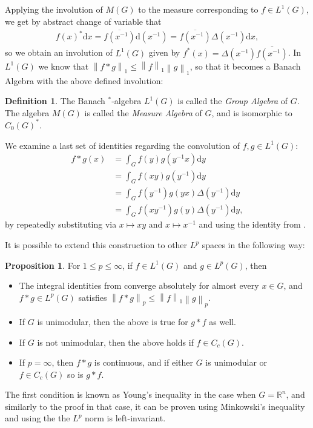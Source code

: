 \documentclass[10pt,twoside,openany,final]{memoir}
\theoremstyle{definition}
\newtheorem{proposition}[theorem]{Proposition}
\newtheorem{definition}[theorem]{Definition}
\theoremstyle{Break}
\newcommand{\lv}{\left\lVert}
\newcommand{\rv}{\right\rVert}
\newcommand{\R}{\mathbb{R}}
\renewcommand{\d}{\mathrm{d}}
\begin{document}
Applying the involution of $M(G)$ to the measure corresponding to $f \in L^1(G)$, we get by abstract change of variable that
\begin{align*}
	f(x)^* \d x = \overline{f(x^{-1})} \d (x^{-1})=\overline{f(x^{-1})} \Delta(x^{-1}) \d x,
\end{align*}
so we obtain an involution of $L^1(G)$ given by $f^*(x)=\Delta(x^{-1}) \overline{f(x^{-1})}$. In $L^1(G)$ we know that $\lv f \ast g \rv_1 \leq \lv f \rv_1 \lv g \rv_1$, so that it becomes a Banach Algebra with the above defined involution:
\begin{definition}
	The Banach $^*$-algebra $L^1(G)$ is called the \emph{Group Algebra} of $G$. The algebra $M(G)$ is called the \emph{Measure Algebra} of $G$, and is isomorphic to $C_0(G)^*$.
	\label{MGdef}
\end{definition}
We examine a last set of identities regarding the convolution of $f,g \in L^1(G)$:
\begin{align}
	f \ast g(x) &= \int_G f(y) g(y^{-1}x) \d y \\
	&= \int_G f(xy) g(y^{-1}) \d y \\
	&= \int_G f(y^{-1}) g(yx) \Delta(y^{-1}) \d y\\
	&= \int_G f(xy^{-1}) g(y) \Delta(y^{-1} ) \d y,
	\label{integralid}
\end{align}
by repeatedly substituting via $x \mapsto xy$ and $x \mapsto x^{-1}$ and using the identity from .

It is possible to extend this construction to other $L^p$ spaces in the following way:
\begin{proposition}
For $1 \leq p \leq \infty$, if $f \in L^1(G)$ and $g \in L^p(G)$, then
\begin{itemize}
	\item The integral identities from  converge absolutely for almost every $x \in G$, and $f \ast g \in L^p(G)$ satisfies $\lv f \ast g \rv_p \leq \lv f \rv_1 \lv g \rv_p$.
	\item If $G$ is unimodular, then the above is true for $g \ast f$ as well.
	\item If $G$ is not unimodular, then the above holds if $f \in C_c(G)$.
	\item If $p = \infty$, then $f \ast g$ is continuous, and if either $G$ is unimodular or $f\in C_c(G)$ so is $g \ast f$.
\end{itemize}
\end{proposition}
The first condition is known as Young's inequality in the case when $G=\R^n$, and similarly to the proof in that case, it can be proven using Minkowski's inequality and using the the $L^p$ norm is left-invariant.
\end{document}
